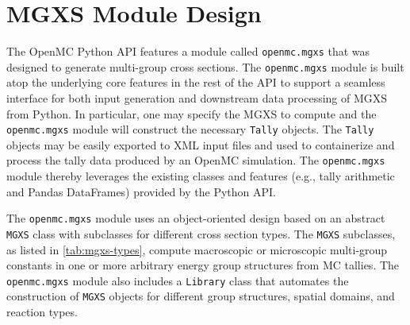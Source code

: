 \section{MGXS Module Design}
\label{sec:design}

The OpenMC Python API features a module called \texttt{openmc.mgxs} that was designed to generate multi-group cross sections. The \texttt{openmc.mgxs} module is built atop the underlying core features in the rest of the API to support a seamless interface for both input generation and downstream data processing of MGXS from Python. In particular, one may specify the MGXS to compute and the \texttt{openmc.mgxs} module will construct the necessary \texttt{Tally} objects. The \texttt{Tally} objects may be easily exported to XML input files and used to containerize and process the tally data produced by an OpenMC simulation. The \texttt{openmc.mgxs} module thereby leverages the existing classes and features (\textrm{e.g.}, tally arithmetic and Pandas DataFrames) provided by the Python API.

The \texttt{openmc.mgxs} module uses an object-oriented design based on an abstract \texttt{MGXS} class with subclasses for different cross section types. The \texttt{MGXS} subclasses, as listed in \cref{tab:mgxs-types}, compute macroscopic or microscopic multi-group constants in one or more arbitrary energy group structures from MC tallies. The \texttt{openmc.mgxs} module also includes a \texttt{Library} class that automates the construction of \texttt{MGXS} objects for different group structures, spatial domains, and reaction types.

